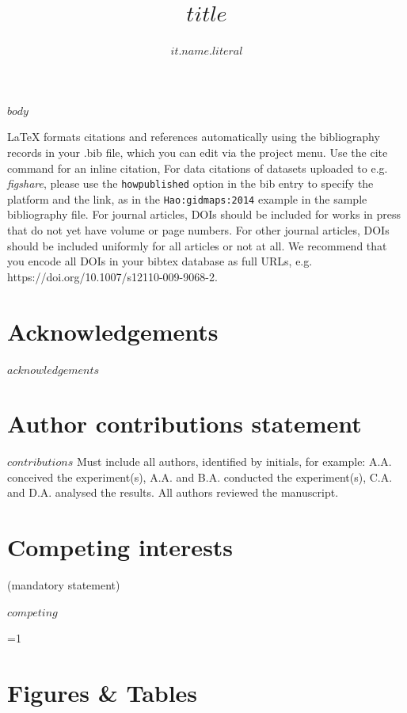 \documentclass[fleqn,10pt]{wlscirep}
\title{$title$}
\author[$for(it.affiliations)$$it.id$$sep$,$endfor$$if(it.attributes.corresponding)$,*$endif$]{$it.name.literal$}
\affil[$it.id$]{$it.name$, $it.department$, $it.city$, $it.state.literal$}
\affil[*]{corresponding author(s): $it.name.literal$ ($it.email$)}
\newcommand{\ifinstruction}{1} %
\begin{document}
\flushbottom
\maketitle

\thispagestyle{empty}

$body$



\noindent LaTeX formats citations and references automatically using the bibliography records in your .bib file, which you can edit via the project menu. Use the cite command for an inline citation, %
For data citations of datasets uploaded to e.g. \emph{figshare}, please use the \verb|howpublished| option in the bib entry to specify the platform and the link, as in the \verb|Hao:gidmaps:2014| example in the sample bibliography file. For journal articles, DOIs should be included for works in press that do not yet have volume or page numbers. For other journal articles, DOIs should be included uniformly for all articles or not at all. We recommend that you encode all DOIs in your bibtex database as full URLs, e.g. https://doi.org/10.1007/s12110-009-9068-2.

\section*{Acknowledgements} 
$acknowledgements$

\section*{Author contributions statement}

$contributions$
Must include all authors, identified by initials, for example:
A.A. conceived the experiment(s), A.A. and B.A. conducted the experiment(s), C.A. and D.A. analysed the results. All authors reviewed the manuscript. 

\section*{Competing interests} (mandatory statement)

$competing$

\ifnum \ifinstruction=1
\section*{Figures \& Tables}
\end{document}
